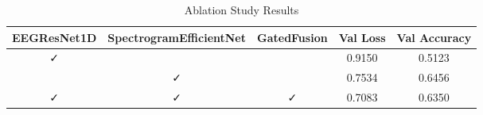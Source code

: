 \begin{table}
\caption{Ablation Study Results}
\label{tab:ablation}
\begin{tabular}{ccc|cc}
\toprule
EEGResNet1D & SpectrogramEfficientNet & GatedFusion & Val Loss & Val Accuracy \\
\midrule
✓ &  &  & 0.9150 & 0.5123 \\
 & ✓ &  & 0.7534 & 0.6456 \\
✓ & ✓ & ✓ & 0.7083 & 0.6350 \\
\bottomrule
\end{tabular}
\end{table}
